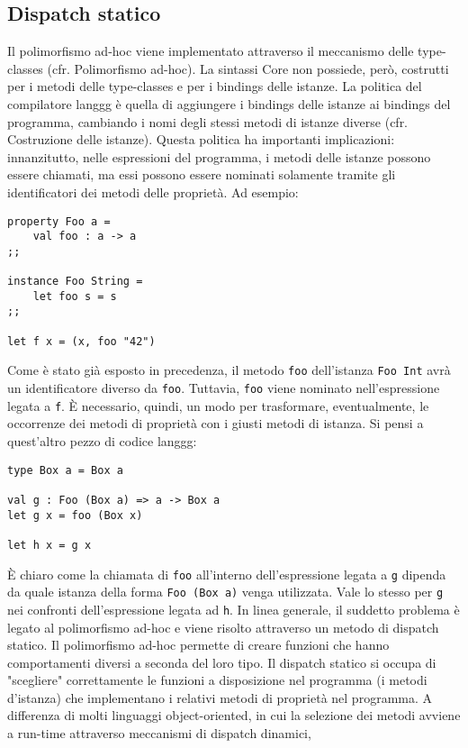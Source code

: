 \documentclass[10pt,a4paper]{article}
\begin{document}
\subsection{Dispatch statico}
Il polimorfismo ad-hoc viene implementato attraverso il meccanismo delle type-classes (cfr. Polimorfismo ad-hoc).
La sintassi Core non possiede, però, costrutti per i metodi delle type-classes e per i bindings delle istanze.
La politica del compilatore langgg è quella di aggiungere i bindings delle istanze ai bindings del programma,
cambiando i nomi degli stessi metodi di istanze diverse (cfr. Costruzione delle istanze). Questa politica ha
importanti implicazioni: innanzitutto, nelle espressioni del programma, i metodi delle istanze possono essere chiamati,
ma essi possono essere nominati solamente tramite gli identificatori dei metodi delle proprietà. Ad esempio:
\begin{lstlisting}
property Foo a =
    val foo : a -> a
;;

instance Foo String =
    let foo s = s
;;

let f x = (x, foo "42")
\end{lstlisting}
Come è stato già esposto in precedenza, il metodo \texttt{foo} dell'istanza \texttt{Foo Int} avrà un identificatore
diverso da \texttt{foo}. Tuttavia, \texttt{foo} viene nominato nell'espressione legata a \texttt{f}. \`E necessario,
quindi, un modo per trasformare, eventualmente, le occorrenze dei metodi di proprietà con i giusti metodi di istanza.
Si pensi a quest'altro pezzo di codice langgg:
\begin{lstlisting}
type Box a = Box a

val g : Foo (Box a) => a -> Box a
let g x = foo (Box x)

let h x = g x
\end{lstlisting}
\`E chiaro come la chiamata di \texttt{foo} all'interno dell'espressione legata a \texttt{g} dipenda da quale istanza
della forma \texttt{Foo (Box a)} venga utilizzata. Vale lo stesso per \texttt{g} nei confronti dell'espressione legata
ad \texttt{h}. In linea generale, il suddetto problema è legato al polimorfismo ad-hoc e viene risolto attraverso un
metodo di dispatch statico. Il polimorfismo ad-hoc permette di creare funzioni che hanno comportamenti diversi a
seconda del loro tipo. Il dispatch statico si occupa di "scegliere" correttamente le funzioni a disposizione nel
programma (i metodi d'istanza) che implementano i relativi metodi di proprietà nel programma. A differenza di molti
linguaggi object-oriented, in cui la selezione dei metodi avviene a run-time attraverso meccanismi di dispatch dinamici,
\end{document}
